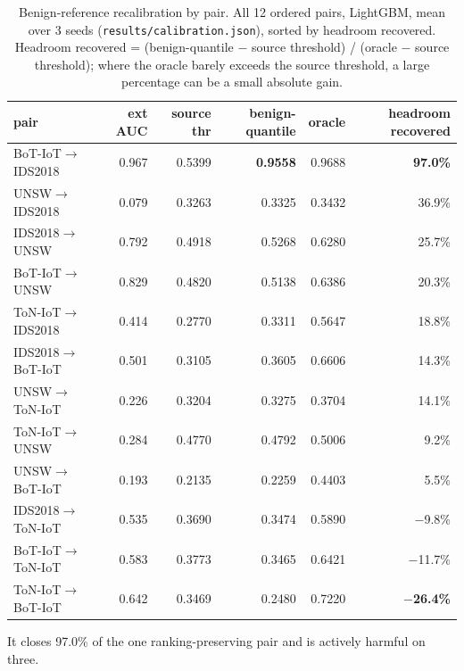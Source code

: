 \documentclass[11pt,a4paper]{article}
\begin{document}
\begin{table}[htbp]\centering\small
\caption{Benign-reference recalibration by pair. All 12 ordered pairs, LightGBM, mean over 3 seeds (\texttt{results/calibration.json}), sorted by headroom recovered. Headroom recovered = (benign-quantile $-$ source threshold) / (oracle $-$ source threshold); where the oracle barely exceeds the source threshold, a large percentage can be a small absolute gain.}
\begin{tabular}{lrrrrr}
\toprule
pair & ext AUC & source thr & benign-quantile & oracle & headroom recovered \\
\midrule
BoT-IoT$\rightarrow$IDS2018 & 0.967 & 0.5399 & \textbf{0.9558} & 0.9688 & \textbf{97.0\%} \\
UNSW$\rightarrow$IDS2018 & 0.079 & 0.3263 & 0.3325 & 0.3432 & 36.9\% \\
IDS2018$\rightarrow$UNSW & 0.792 & 0.4918 & 0.5268 & 0.6280 & 25.7\% \\
BoT-IoT$\rightarrow$UNSW & 0.829 & 0.4820 & 0.5138 & 0.6386 & 20.3\% \\
ToN-IoT$\rightarrow$IDS2018 & 0.414 & 0.2770 & 0.3311 & 0.5647 & 18.8\% \\
IDS2018$\rightarrow$BoT-IoT & 0.501 & 0.3105 & 0.3605 & 0.6606 & 14.3\% \\
UNSW$\rightarrow$ToN-IoT & 0.226 & 0.3204 & 0.3275 & 0.3704 & 14.1\% \\
ToN-IoT$\rightarrow$UNSW & 0.284 & 0.4770 & 0.4792 & 0.5006 & 9.2\% \\
UNSW$\rightarrow$BoT-IoT & 0.193 & 0.2135 & 0.2259 & 0.4403 & 5.5\% \\
IDS2018$\rightarrow$ToN-IoT & 0.535 & 0.3690 & 0.3474 & 0.5890 & $-$9.8\% \\
BoT-IoT$\rightarrow$ToN-IoT & 0.583 & 0.3773 & 0.3465 & 0.6421 & $-$11.7\% \\
ToN-IoT$\rightarrow$BoT-IoT & 0.642 & 0.3469 & 0.2480 & 0.7220 & \textbf{$-$26.4\%} \\
\bottomrule
\end{tabular}
\end{table}

It closes 97.0\% of the one ranking-preserving pair and is actively harmful on three.
\end{document}
